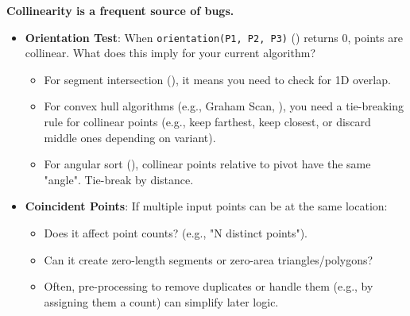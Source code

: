 \begin{insight}
\label{insight:A.3.4.collinearity_is_key}
\textbf{Collinearity is a frequent source of bugs.}
\begin{itemize}
    \item \textbf{Orientation Test}: When \texttt{orientation(P1, P2, P3)} () returns 0, points are collinear. What does this imply for your current algorithm?
        \begin{itemize}
            \item For segment intersection (), it means you need to check for 1D overlap.
            \item For convex hull algorithms (e.g., Graham Scan, ), you need a tie-breaking rule for collinear points (e.g., keep farthest, keep closest, or discard middle ones depending on variant).
            \item For angular sort (), collinear points relative to pivot have the same "angle". Tie-break by distance.
        \end{itemize}
    \item \textbf{Coincident Points}: If multiple input points can be at the same location:
        \begin{itemize}
            \item Does it affect point counts? (e.g., "N distinct points").
            \item Can it create zero-length segments or zero-area triangles/polygons?
            \item Often, pre-processing to remove duplicates or handle them (e.g., by assigning them a count) can simplify later logic.
        \end{itemize}
\end{itemize}
\end{insight}

